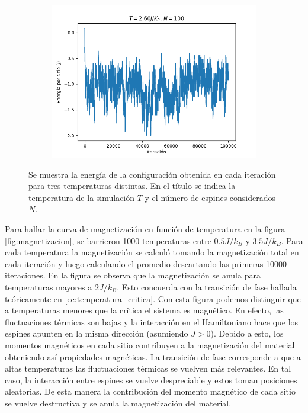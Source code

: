 \documentclass{article}
\begin{document}
\begin{figure}
\begin{subfigure}{0.49\textwidth}
\end{subfigure}
\begin{subfigure}{0.49\textwidth}
\includegraphics[width=\textwidth]{energia_700.png}
\end{subfigure}
\caption{\label{fig:energias}Se muestra la energía de la configuración obtenida en cada iteración para tres temperaturas distintas. En el título se indica la temperatura de la simulación $T$ y el número de espines considerados $N$.}
\end{figure}

Para hallar la curva de magnetización en función de temperatura en la figura \ref{fig:magnetizacion}, se barrieron 1000 temperaturas entre $0.5J/k_B$ y $3.5J/k_B$. Para cada temperatura la magnetización se calculó tomando la magnetización total en cada iteración y luego calculando el promedio descartando las primeras 10000 iteraciones. En la figura se observa que la magnetización se anula para temperaturas mayores a $2J/k_B$. Esto concuerda con la transición de fase hallada teóricamente en \eqref{ec:temperatura_critica}. Con esta figura podemos distinguir que a temperaturas menores que la crítica el sistema es magnético. En efecto, las fluctuaciones térmicas son bajas y la interacción en el Hamiltoniano hace que los espines apunten en la misma dirección (asumiendo $J>0$). Debido a esto, los momentos magnéticos en cada sitio contribuyen a la magnetización del material obteniendo así propiedades magnéticas. La transición de fase corresponde a que a altas temperaturas las fluctuaciones térmicas se vuelven más relevantes. En tal caso, la interacción entre espines se vuelve despreciable y estos toman posiciones aleatorias. De esta manera la contribución del momento magnético de cada sitio se vuelve destructiva y se anula la magnetización del material. 
\end{document}
